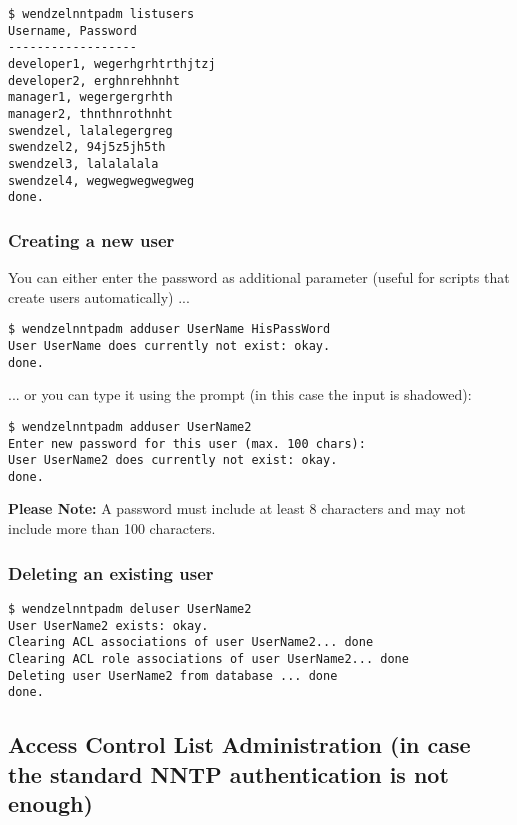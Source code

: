 \documentclass[12pt,fleqn,leqno]{scrbook}
\begin{document}
\begin{verbatim}
$ wendzelnntpadm listusers
Username, Password
------------------
developer1, wegerhgrhtrthjtzj
developer2, erghnrehhnht
manager1, wegergergrhth
manager2, thnthnrothnht
swendzel, lalalegergreg
swendzel2, 94j5z5jh5th
swendzel3, lalalalala
swendzel4, wegwegwegwegweg
done.
\end{verbatim}

\hypertarget{creating-a-new-user}{%
\subsubsection{Creating a new user}\label{creating-a-new-user}}

You can either enter the password as additional parameter (useful for
scripts that create users automatically) ...

\begin{verbatim}
$ wendzelnntpadm adduser UserName HisPassWord
User UserName does currently not exist: okay.
done.
\end{verbatim}

... or you can type it using the prompt (in this case the input is
shadowed):

\begin{verbatim}
$ wendzelnntpadm adduser UserName2
Enter new password for this user (max. 100 chars):
User UserName2 does currently not exist: okay.
done.
\end{verbatim}

\textbf{Please Note:} A password must include at least 8 characters and
may not include more than 100 characters.

\hypertarget{deleting-an-existing-user}{%
\subsubsection{Deleting an existing
user}\label{deleting-an-existing-user}}

\begin{verbatim}
$ wendzelnntpadm deluser UserName2
User UserName2 exists: okay.
Clearing ACL associations of user UserName2... done
Clearing ACL role associations of user UserName2... done
Deleting user UserName2 from database ... done
done.
\end{verbatim}

\hypertarget{access-control-list-administration-in-case-the-standard-nntp-authentication-is-not-enough}{%
\subsection{Access Control List Administration (in case the standard
NNTP authentication is not
enough)}\label{access-control-list-administration-in-case-the-standard-nntp-authentication-is-not-enough}}
\end{document}
